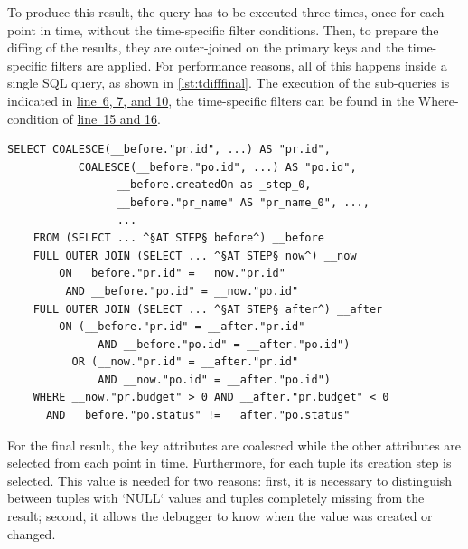 \documentclass[english]{scrartcl}
\newcommand{\linerefn}[2]{\hyperref[#1]{line~#2}}
\begin{document}

To produce this result, the query has to be executed three times, once for each point in time, without the time-specific filter conditions.
Then, to prepare the diffing of the results, they are outer-joined on the primary keys and the time-specific filters are applied.
For performance reasons, all of this happens inside a single SQL query, as shown in \cref{lst:tdifffinal}.
The execution of the sub-queries is indicated in \linerefn{lst:tdifffinal}{6, 7, and 10}, the time-specific filters can be found in the Where-condition of \linerefn{lst:tdifffinal}{15 and 16}.

\begin{lstlisting}[language=HanaSQL,float,caption={Parts of the time-diff query after transformation},label=lst:tdifffinal]
	SELECT COALESCE(__before."pr.id", ...) AS "pr.id",
	       COALESCE(__before."po.id", ...) AS "po.id",
				 __before.createdOn as _step_0,
				 __before."pr_name" AS "pr_name_0", ...,
				 ...
	FROM (SELECT ... ^§AT STEP§ before^) __before
	FULL OUTER JOIN (SELECT ... ^§AT STEP§ now^) __now
	    ON __before."pr.id" = __now."pr.id" 
		 AND __before."po.id" = __now."po.id"
	FULL OUTER JOIN (SELECT ... ^§AT STEP§ after^) __after
	    ON (__before."pr.id" = __after."pr.id" 
		      AND __before."po.id" = __after."po.id")
		  OR (__now."pr.id" = __after."pr.id" 
		      AND __now."po.id" = __after."po.id")
	WHERE __now."pr.budget" > 0 AND __after."pr.budget" < 0
	  AND __before."po.status" != __after."po.status"
\end{lstlisting}

For the final result, the key attributes are coalesced while the other attributes are selected from each point in time.
Furthermore, for each tuple its creation step is selected.
This value is needed for two reasons: first, it is necessary to distinguish between tuples with `NULL` values and tuples completely missing from the result; second, it allows the debugger to know when the value was created or changed.
\end{document}
